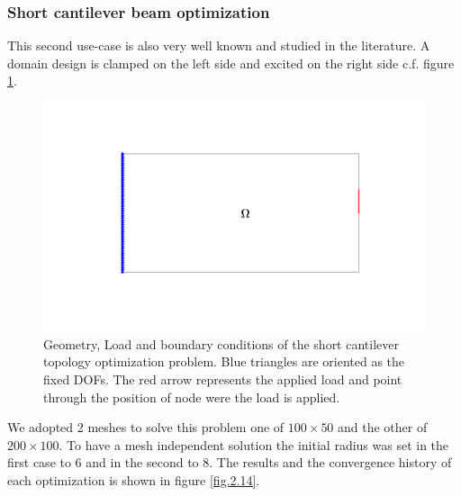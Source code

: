 \subsubsection{Short cantilever beam optimization}
This second use-case is also very well known and studied in the literature. A domain design is clamped on the left side and excited on the right side c.f. figure \ref{fig.2.13}.
\begin{figure}[ht]
\centering
\includegraphics[width=\textwidth]{images/Ch2/design_problem2}
\caption{Geometry, Load and boundary conditions of the short cantilever topology optimization problem. Blue triangles are oriented as the fixed DOFs. The red arrow represents the applied load and point through the position of node were the load is applied.}
\label{fig.2.13}
\end{figure}
We adopted 2 meshes to solve this problem one of $100\times50$ and the other of $200\times100$. To have a mesh independent solution the initial radius was set in the first case to 6 and in the second to 8. The results and the convergence history of each optimization is shown in figure \ref{fig.2.14}. 
